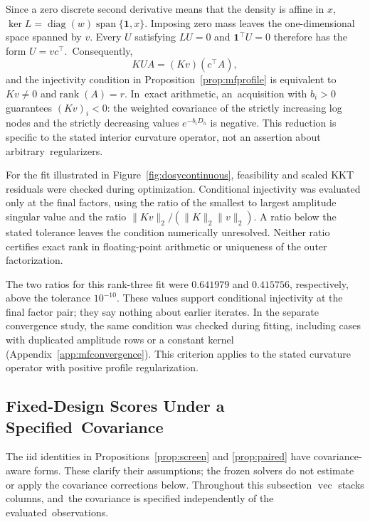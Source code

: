 \documentclass[mathematics,article,accept,moreauthors]{Definitions/mdpi}
\newcommand{\one}{\mathbf{1}}
\newcommand{\rank}{\operatorname{rank}}
\newcommand{\diag}{\operatorname{diag}}
\begin{document}
Since a zero discrete second derivative means that the density is affine in $x$,\linebreak   $\ker L=\diag(w)\operatorname{span}\{\one,x\}$. Imposing zero mass leaves the one-dimensional space spanned by $v$. Every $U$ satisfying $LU=0$ and $\one^\top U=0$ therefore has the form \mbox{$U=vc^\top$. Consequently,}
\[
 KUA=(Kv)(c^\top A),
\]
and the injectivity condition in Proposition~\ref{prop:mfprofile} is equivalent to $Kv\ne0$ and\linebreak   $\rank(A)=r$. In~exact arithmetic, an~acquisition with $b_i>0$ guarantees $(Kv)_i<0$: the weighted covariance of the strictly increasing log nodes and the strictly decreasing values $e^{-b_iD_h}$ is negative. This reduction is specific to the stated interior curvature operator, not an assertion about arbitrary~regularizers.

For the fit illustrated in Figure~\ref{fig:dosycontinuous}, feasibility and scaled KKT residuals were checked during optimization. Conditional injectivity was evaluated only at the final factors, using the ratio of the smallest to largest amplitude singular value and the ratio $\|Kv\|_2/(\|K\|_2\|v\|_2)$. A ratio below the stated tolerance leaves the condition numerically unresolved. Neither ratio certifies exact rank in floating-point arithmetic or uniqueness of the outer factorization.

The two ratios for this rank-three fit were $0.641979$ and $0.415756$, respectively, above the tolerance $10^{-10}$. These values support conditional injectivity at the final factor pair; they say nothing about earlier iterates. In the separate convergence study, the same condition was checked during fitting, including cases with duplicated amplitude rows or a constant kernel (Appendix~\ref{app:mfconvergence}). This criterion applies to the stated curvature operator with positive profile regularization.

\subsection{Fixed-Design Scores Under a Specified~Covariance}\label{app:covariance}
The iid identities in Propositions~\ref{prop:screen} and \ref{prop:paired} have covariance-aware forms. These clarify their assumptions; the frozen solvers do not estimate or apply the covariance corrections below. Throughout this subsection $\operatorname{vec}$ stacks columns, and~the covariance is specified independently of the evaluated~observations.
\end{document}
